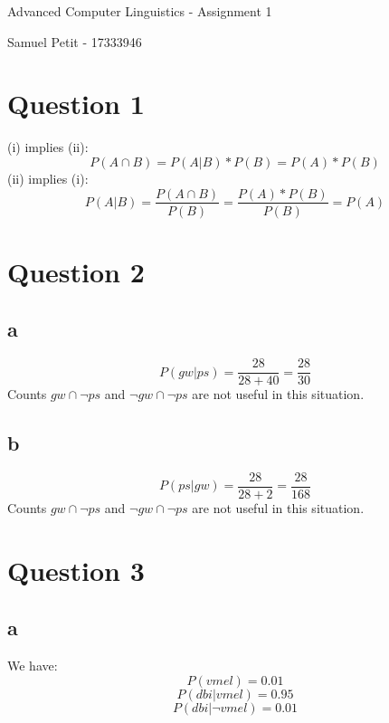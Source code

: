 \documentclass[10pt]{article}
\begin{document}
{\centering
    Advanced Computer Linguistics - Assignment 1
    \par
    Samuel Petit - 17333946
    \par
}
\section*{Question 1}
(i) implies (ii):
\begin{equation*}
    P(A \cap B) = P(A|B) * P(B) = P(A) * P(B)
\end{equation*}
(ii) implies (i):
\begin{equation*}
    P(A|B) = \frac{P(A \cap B)}{P(B)} = \frac{P(A) * P(B)}{P(B)} = P(A)
\end{equation*}

\section*{Question 2}
\subsection*{a}
\begin{equation*}
    P(gw|ps) = \frac{28}{28 + 40} = \frac{28}{30}
\end{equation*}
Counts $gw  \cap\neg ps$ and $\neg gw  \cap\neg ps$ are not useful in this situation.

\subsection*{b}
\begin{equation*}
    P(ps|gw) = \frac{28}{28 + 2} = \frac{28}{168}
\end{equation*}
Counts $gw  \cap\neg ps$ and $\neg gw  \cap\neg ps$ are not useful in this situation.

\section*{Question 3}
\subsection*{a}
We have:
\begin{equation*}
    P(vmel) = 0.01
\end{equation*}
\begin{equation*}
    P(dbi|vmel) = 0.95
\end{equation*}
\begin{equation*}
    P(dbi|\neg vmel) = 0.01
\end{equation*}
\end{document}
